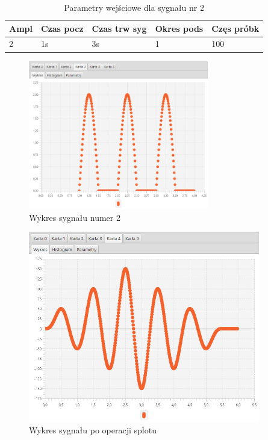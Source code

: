 \documentclass[12pt]{article}
\begin{document}
{{{                \begin{table}[H]
                    \centering
                    \begin{tabular}{|l|l|l|l|l|}
                        \hline
                        Ampl & Czas pocz & Czas trw syg & Okres pods & Częs próbk   \\ \hline
                        2 & 1s & 3s & 1 & 100           \\ \hline
                    \end{tabular}
                    \caption{Parametry wejściowe dla sygnału nr 2}
                \end{table}
                \begin{figure}[H]
                    \centering
                    \includegraphics[width=0.7\textwidth]{img/result/convolution/experiment2/data_122752.png}
                    \caption{Wykres sygnału numer 2}
                \end{figure}

                \begin{figure}[H]
                    \centering
                    \includegraphics[width=0.9\textwidth]{img/result/convolution/experiment2/data_122802.png}
                    \caption{Wykres sygnału po operacji splotu}
                \end{figure}
            }
            \newpage

}}
\end{document}
